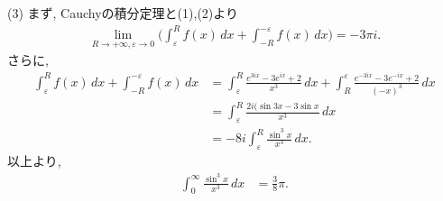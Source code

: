 ﻿\documentclass[a4paper,12pt]{jarticle}
\begin{document}
(3)
  まず, Cauchyの積分定理と(1),(2)より
  \begin{align*}
    \lim_{R\to+\infty, \varepsilon\to 0}
    \biggl(\int_\varepsilon^R f(x)\,dx+\int_{-R}^{-\varepsilon}f(x)\,dx\biggr)
    =-3\pi i.
  \end{align*}
  さらに, 
  \begin{align*}
    \int_\varepsilon^R f(x)\,dx+\int_{-R}^{-\varepsilon}f(x)\,dx
    &=\int_\varepsilon^R \frac{e^{3ix}-3e^{ix}+2}{x^3}\,dx
    +\int_{R}^{\varepsilon}\frac{e^{-3ix}-3e^{-ix}+2}{(-x)^3}\,dx \\
    &=\int_\varepsilon^R \frac{2i(\sin 3x-3\sin x}{x^3}\,dx \\
    &=-8i\int_\varepsilon^R \frac{\sin^3 x}{x^3}\,dx.
  \end{align*}
  以上より, 
  \begin{align*}
    \int_0^\infty \frac{\sin^3 x}{x^3}\,dx
    &=\frac{3}{8}\pi.
  \end{align*}
\end{document}
